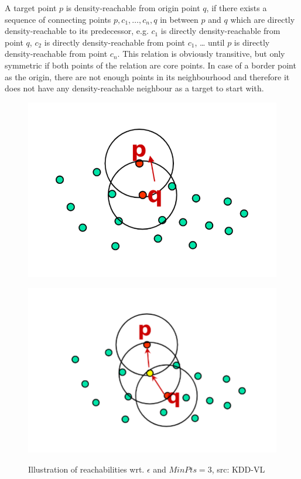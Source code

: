 A target point $p$ is density-reachable from origin point $q$, if there exists a sequence of connecting points $p, c_1, \dotsc, c_n, q$ in between $p$ and $q$ which are directly density-reachable to its predecessor, e.g. $c_1$ is directly density-reachable from point $q$, $c_2$ is directly density-reachable from point $c_1$, \dots{} until $p$ is directly density-reachable from point $c_n$. This relation is obviously transitive, but only symmetric if both points of the relation are core points. In case of a border point as the origin, there are not enough points in its neighbourhood and therefore it does not have any density-reachable neighbour as a target to start with.

\begin{figure}
    \centering
    \begin{minipage}[t]{.5\textwidth}
      \centering  
      \captionsetup{width=.9\linewidth}
      \includegraphics[width=.8\textwidth]{figures/directlydensityreachable.png}
      \label{fig:directdensityreachable}
    \end{minipage}%
    \begin{minipage}[t]{.5\textwidth}
      \centering
      \captionsetup{width=.9\linewidth}
      \includegraphics[width=.8\textwidth]{figures/density-reachable.png}
      \label{fig:densityreachable}
    \end{minipage}
    \caption{Illustration of reachabilities wrt. $\epsilon$ and $MinPts = 3$, src: KDD-VL}
\end{figure}

